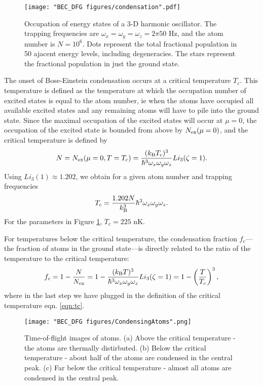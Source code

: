 \begin{figure}
	\texttt{[image: "BEC\_DFG figures/condensation".pdf]}
\caption{Occupation of energy states of a 3-D harmonic oscillator. The trapping frequencies are $\omega_x=\omega_y=\omega_z=2\pi 50$ Hz, and the atom number is $N=10^6$. Dots represent the total fractional population in 50 ajacent energy levels, including degeneracies. The stars represent the fractional population in just the ground state.  }
\label{fig:BoseDistribution}
\end{figure}

The onset of Bose-Einstein condensation occurs at a critical temperature $T_c$. This temperature is defined as the temperature at which the occupation number of excited states is equal to the atom number, ie when the atoms have occupied all available excited states and any remaining atoms will have to pile into the ground state. Since the maximal occupation of the excited states will occur at $\mu=0$, the occupation of the excited state is bounded from above by $N_{\rm ex}(\mu=0)$, and the critical temperature is defined by 
\begin{equation}
N=N_{\rm ex}(\mu=0, T=T_c)=\frac{(k_{\rm B}T_c)^3}{\hbar^3 \omega_x \omega_y \omega_z}Li_3(\zeta=1).
\end{equation}
Using $Li_3(1)\approx1.202$, we obtain for a given atom number and trapping frequencies
\begin{equation}
T_c = \frac{1.202 N}{k_{\rm B}^3}\hbar^3 \omega_x \omega_y \omega_z.
\label{eqn:tc}
\end{equation}
For the parameters in Figure \ref{fig:BoseDistribution}, $T_c = 225$ nK. 

For temperatures below the critical temperature, the condensation fraction $f_c$---the fraction of atoms in the ground state---is directly related to the ratio of the temperature to the critical temperature:
\begin{equation}
f_c=1-\frac{N}{N_{\rm ex}}=1-\frac{(k_{\rm B}T)^3}{\hbar^3 \omega_x \omega_y \omega_z}Li_3(\zeta=1)=1-\left(\frac{T}{T_c}\right)^3,
\end{equation}
where in the last step we have plugged in the definition of the critical temperature eqn. \ref{eqn:tc}.

\begin{figure}
	\texttt{[image: "BEC\_DFG figures/CondensingAtoms".png]}
\caption{Time-of-flight images of atoms. (a) Above the critical temperature - the atoms are thermally distirbuted. (b) Below the critical temperature - about half of the atoms are condensed in the central peak. (c) Far below the critical temperature - almost all atoms are condensed in the central peak.}
\label{fig:CondensingAtoms}
\end{figure}

